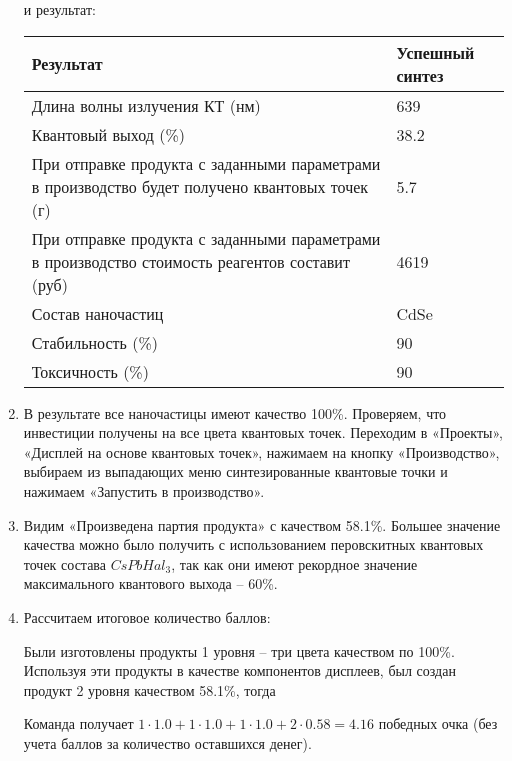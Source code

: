 \begin{enumerate}
    и результат:

    \begin{table}[H]
        \begin{center}
            \begin{tabular}{|p{9cm}|p{4cm}|}
                \hline
                Результат	&Успешный синтез \\
                \hline
                Длина волны излучения КТ (нм)&	639 \\
                \hline
                Квантовый выход (\%)	&38.2 \\
                \hline
                При отправке продукта с заданными параметрами в производство будет получено квантовых точек (г)	&5.7 \\
                \hline
                При отправке продукта с заданными параметрами в производство стоимость реагентов составит (руб)&	4619 \\
                \hline
                Состав наночастиц&	CdSe \\
                \hline
                Стабильность (\%)	&90 \\
                \hline
                Токсичность (\%)&	90 \\
                \hline
            \end{tabular}
        \end{center}
    \end{table}

    \item В результате все наночастицы имеют качество 100\%. Проверяем, что инвестиции получены на все цвета квантовых точек. Переходим в «Проекты», «Дисплей на основе квантовых точек», нажимаем на кнопку «Производство», выбираем из выпадающих меню синтезированные квантовые точки и нажимаем «Запустить в производство».
    \item Видим «Произведена партия продукта» с качеством 58.1\%. Большее значение качества можно было получить с использованием перовскитных квантовых точек состава $CsPbHal_3$, так как они имеют рекордное значение максимального квантового выхода – 60\%.
    \item Рассчитаем итоговое количество баллов:
    
    Были изготовлены продукты 1 уровня – три цвета качеством по 100\%. Используя эти продукты в качестве компонентов дисплеев, был создан продукт 2 уровня качеством 58.1\%, тогда

    Команда получает $1 \cdot 1.0 + 1 \cdot 1.0 + 1 \cdot 1.0 + 2 \cdot 0.58 = 4.16$ победных очка (без учета баллов за количество оставшихся денег).
\end{enumerate}

